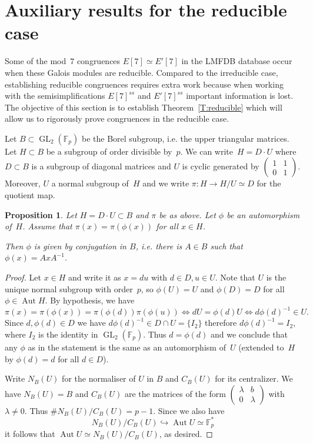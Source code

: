 \documentclass[12pt]{amsart}
\newcommand{\F}{\mathbb{F}}
\DeclareMathOperator{\Aut}{Aut}
\newcommand{\GL}{\operatorname{GL}}
\numberwithin{equation}{section}
\newtheorem{proposition}[theorem]{Proposition}
\theoremstyle{definition}
\theoremstyle{remark}
\begin{document}
\section{Auxiliary results for the reducible case}

Some of the mod~$7$ congruences 
$E[7] \simeq E'[7]$ in the LMFDB database occur 
when these Galois modules are reducible. Compared to the irreducible case, establishing reducible congruences requires extra work because when working with the semisimplifications $E[7]^{ss}$ and $E'[7]^{ss}$ important information is lost.
The objective of this section is to establish Theorem~\ref{T:reducible} which will allow us to rigorously prove congruences in the reducible case.


Let $B \subset \GL_2(\F_p)$ be the Borel subgroup, i.e. the upper triangular matrices. Let $H \subset B$ be a subgroup of order divisible by~$p$. 
We can write~$H = D\cdot U$ where $D \subset B$ is a subgroup of diagonal matrices and 
$U$ is cyclic generated by $\left(\begin{smallmatrix}
                            1 & 1 \\
                            0 & 1
                            \end{smallmatrix} \right)$.   
Moreover, $U$ a normal subgroup of~$H$ 
and we write $\pi : H \to H/U \simeq D$ for the quotient map.

\begin{proposition} \label{P:inner}
Let $H = D \cdot U \subset B$ and $\pi$ be as above. 
Let $\phi$ be an automorphism of~$H$. Assume that  
$\pi(x) = \pi(\phi(x))$ for all $x \in H$. 

Then $\phi$ is given by conjugation in $B$, i.e. there is $A \in B$ such that $\phi(x) = AxA^{-1}$. 
\end{proposition}
\begin{proof}
Let $x \in H$ and write it as $x = du$ with $d \in D, u \in U$.
Note that $U$ is the unique normal subgroup with order~$p$, so 
$\phi(U) = U$ and $\phi(D)=D$ for all $\phi \in \Aut H$.
By hypothesis, we have 
\[
 \pi(x) = \pi(\phi(x)) = \pi(\phi(d))\pi(\phi(u)) \iff dU = \phi(d)U
 \iff d\phi(d)^{-1} \in U.
\]
Since $d, \phi(d) \in D$ we have $d\phi(d)^{-1} \in D \cap U = \{ I_2\}$ therefore $d\phi(d)^{-1} = I_2$, where $I_2$ is the identity in $\GL_2(\F_p)$.
Thus $d = \phi(d)$ and we conclude that any $\phi$ 
as in the statement is the same as an automorphism of~$U$ (extended to~$H$ by $\phi(d)=d$ for all $d\in D$). 

Write $N_B(U)$  for the normaliser of $U$ in $B$ and $C_B(U)$ for its centralizer. 
We have $N_B(U) = B$ 
and $C_B(U)$ are the matrices of the form $\left(\begin{smallmatrix}
                            \lambda & b \\
                            0 & \lambda
                            \end{smallmatrix} \right)$
with $\lambda \neq 0$. Thus $\# N_B(U)/C_B(U) = p-1$. 
Since  we also have 
\[
 N_B(U)/C_B(U) \hookrightarrow \Aut U \simeq \F_p^*
\]
it follows that $\Aut U \simeq N_B(U)/C_B(U)$, as desired.
\end{proof}
\end{document}
